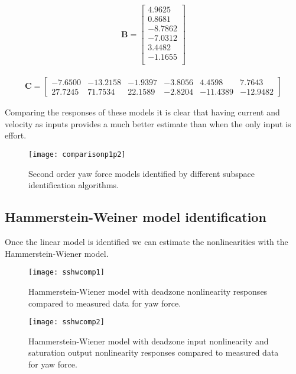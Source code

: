 \begin{align}
\mathbf{B} = \begin{bmatrix}
    4.9625\\
    0.8681\\
   -8.7862\\
   -7.0312\\
    3.4482\\
   -1.1655\\
     \end{bmatrix}
\end{align}

\begin{align}
\mathbf{C} = \begin{bmatrix}
   -7.6500  &-13.2158   &-1.9397   &-3.8056    &4.4598    &7.7643\\
   27.7245   &71.7534   &22.1589   &-2.8204  &-11.4389  &-12.9482     
\end{bmatrix}
\end{align}

Comparing the responses of these models it is clear that having current and velocity as inputs provides a much better estimate than when the only input is effort.

\begin{figure}[H]
\centering
\hspace{-2em}\texttt{[image: comparisonp1p2]}
\caption{Second order yaw force models identified by different subspace identification algorithms.}
\label{fig:1LMI2}
\end{figure}
\subsection{Hammerstein-Weiner model identification}

Once the linear model is identified we can estimate the nonlinearities with the Hammerstein-Wiener model.

\begin{figure}[H]
\centering
\hspace{-2.5em}\texttt{[image: sshwcomp1]}
\caption{Hammerstein-Wiener model with deadzone nonlinearity responses compared to measured data for yaw force.}
\label{fig:2LMI}
\end{figure}

\begin{figure}[H]
\centering
\hspace{-2.5em}\texttt{[image: sshwcomp2]}
\caption{Hammerstein-Wiener model with deadzone input nonlinearity and saturation output nonlinearity responses compared to measured data for yaw force.}
\label{fig:2LMI1}
\end{figure}

